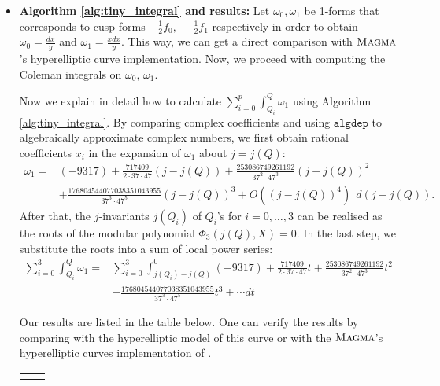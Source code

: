 \begin{itemize}
\item \textbf{Algorithm \ref{alg:tiny_integral} and results:} Let $\omega_0,\omega_1$ be 1-forms that corresponds to cusp forms $-\frac{1}{2}f_0,\,-\frac{1}{2}f_1$ respectively in order to obtain $\omega_0 = \frac{dx}{y}$ and $\omega_1 = \frac{xdx}{y}$. This way, we can get a direct comparison with $\textsc{Magma}{}$'s hyperelliptic curve implementation. Now, we proceed with computing the Coleman integrals on $\omega_0,\,\omega_1$. 




Now we explain in detail how to calculate $\sum_{i=0}^{p}\int^Q_{Q_i} \omega_1$ using Algorithm \ref{alg:tiny_integral}. By comparing complex coefficients and using $\texttt{algdep}$ to algebraically approximate complex numbers, we first obtain rational coefficients $x_i$ in the expansion of $\omega_1$ about $j=j(Q)$:
\begin{align*} \omega_1  = &(-9317) + \frac{717409}{2 \cdot 37 \cdot 47}(j-j(Q))
                             + \frac{253086749261192}{37^2 \cdot 47^3}(j-j(Q))^2
  \\ &+ \frac{176804544077038351043955}{37^3 \cdot 47^5}(j-j(Q))^3 +
       O((j-j(Q))^4) \ \ d(j-j(Q)). \end{align*}
     After that, the $j$-invariants $j(Q_i)$ of $Q_i$'s for $i = 0,\ldots,3$ can be realised as the roots of the modular polynomial $\Phi_3(j(Q),X) =0 $. In the last step, we substitute the roots into a sum of local power series: 
\begin{align*}
    \sum_{i=0}^3 \int_{Q_i}^Q \omega_1 = &\sum_{i=0}^3 \int_{j(Q_i)-j(Q)}^{0} (-9317) + \frac{717409}{2 \cdot 37 \cdot 47}t + \frac{253086749261192}{37^2 \cdot 47^3}t^2 \\&+ \frac{176804544077038351043955}{37^3 \cdot 47^5}t^3 +  \cdots  dt 
\end{align*}


Our results are listed in the table below. One can verify the results by comparing with the hyperelliptic model of this curve or with the $\textsc{Magma}{}$'s hyperelliptic curves implementation of \cite{balatuit}.


\begin{table}[h]

    \centering
    \begin{tabular}{|l|l|}
    \hline
    \rule{0pt}{4ex}    


\end{tabular}
\end{table}
\end{itemize}
